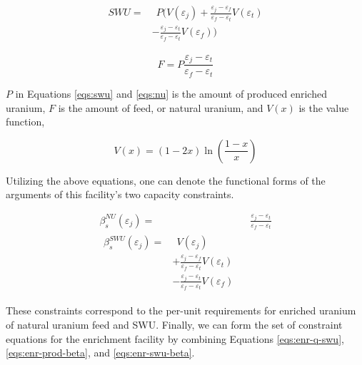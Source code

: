 \begin{align}
\begin{split}
\label{eqs:swu}
SWU = & \:\: P ( V(\varepsilon_{j}) 
      + \frac{\varepsilon_{j} - \varepsilon_{f}}
               {\varepsilon_{f} - \varepsilon_{t}} V(\varepsilon_{t}) \\
      & - \frac{\varepsilon_{j} - \varepsilon_{t}}
               {\varepsilon_{f} - \varepsilon_{t}} V(\varepsilon_{f}) )
\end{split}
\end{align}

\begin{equation}
\label{eqs:nu}
F = P \frac{\varepsilon_{j} - \varepsilon_{t}}
           {\varepsilon_{f} - \varepsilon_{t}}
\end{equation}

\noindent
$P$ in Equations \ref{eqs:swu} and \ref{eqs:nu} is the amount of produced
enriched uranium, $F$ is the amount of feed, or natural uranium, and $V(x)$ is
the value function,

\begin{equation}\label{eqs:value}
  V(x) = (1-2x) \ln \left(\frac{1-x}{x}\right)
\end{equation}

Utilizing the above equations, one can denote the functional forms of the
arguments of this facility's two capacity constraints.

\begin{align}
\label{eqs:enr-prod-beta}
\beta_{s}^{NU}(\varepsilon_{j}) = & \:\: \frac{\varepsilon_{j} - \varepsilon_{t}}
                                      {\varepsilon_{f} - \varepsilon_{t}} \\
\begin{split}
\label{eqs:enr-swu-beta}
\beta_{s}^{SWU}(\varepsilon_{j}) = & \:\: V(\varepsilon_{j}) \\
                         & + \frac{\varepsilon_{j} - \varepsilon_{f}}
                                  {\varepsilon_{f} - \varepsilon_{t}} V(\varepsilon_{t}) \\
                         & - \frac{\varepsilon_{j} - \varepsilon_{t}}
                                  {\varepsilon_{f} - \varepsilon_{t}} V(\varepsilon_{f})
\end{split}
\end{align}

These constraints correspond to the per-unit requirements for enriched uranium
of natural uranium feed and SWU. Finally, we can form the set of constraint
equations for the enrichment facility by combining Equations
\ref{eqs:enr-q-swu}, \ref{eqs:enr-prod-beta}, and \ref{eqs:enr-swu-beta}.

